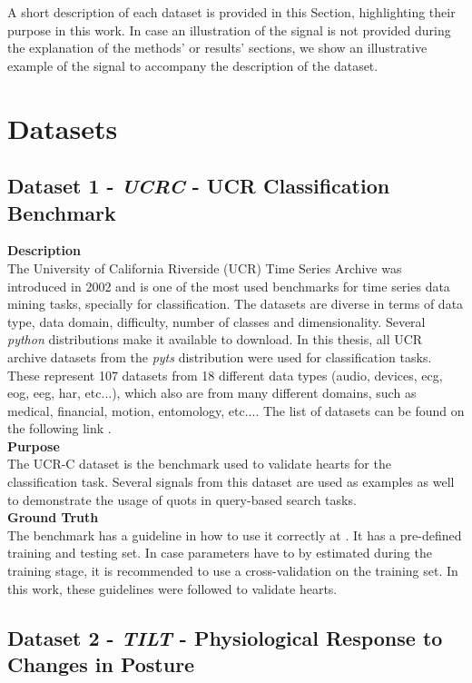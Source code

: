 A short description of each dataset is provided in this Section, highlighting their purpose in this work. In case an illustration of the signal is not provided during the explanation of the methods' or results' sections, we show an illustrative example of the signal to accompany the description of the dataset.

\section{Datasets}
\label{sec:dataset}

\subsection{Dataset 1 - \textit{UCRC} - UCR Classification Benchmark}
\label{sec:dat_ucr}
\textbf{Description}\hfill\\
The University of California Riverside (UCR) Time Series Archive was introduced in 2002 and is one of the most used benchmarks for time series data mining tasks, specially for classification. The datasets are diverse in terms of data type, data domain, difficulty, number of classes and dimensionality\cite{ucr}. Several \textit{python} distributions make it available to download. In this thesis, all UCR archive datasets from the \textit{pyts} distribution were used for classification tasks. These represent 107 datasets from 18 different data types (audio, devices, \gls{ecg}, \gls{eog}, \gls{eeg}, \gls{har}, etc...), which also are from many different domains, such as medical, financial, motion, entomology, etc...\cite{ucr}. The list of datasets can be found on the following link \cite{ucr_site}.\\
\textbf{Purpose}\hfill\\
The UCR-C dataset is the benchmark used to validate \gls{hearts} for the classification task. Several signals from this dataset are used as examples as well to demonstrate the usage of \gls{quots} in query-based search tasks.\\
\textbf{Ground Truth}\hfill\\
The benchmark has a guideline in how to use it correctly at \cite{ucr}. It has a pre-defined training and testing set. In case parameters have to by estimated during the training stage, it is recommended to use a cross-validation on the training set. In this work, these guidelines were followed to validate \gls{hearts}.

\subsection{Dataset 2 - \textit{TILT} - Physiological Response to Changes in Posture}
\label{dat:dataset2}

